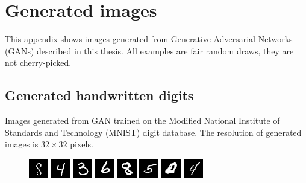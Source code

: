 \chapter{Generated images}
This appendix shows images generated from Generative Adversarial Networks (GANs) described in this thesis. All examples are fair random draws, they are not cherry-picked.

\section*{Generated handwritten digits}
Images generated from GAN trained on the Modified National Institute of Standards and Technology (MNIST) digit database. The resolution of generated images is $32 \times 32$ pixels.

\begin{figure}[!h]
    \centerline{
        \includegraphics[scale=1]{figures/mnist/appendix/mnist32x32_image0024.png}
        \includegraphics[scale=1]{figures/mnist/appendix/mnist32x32_image0025.png}
        \includegraphics[scale=1]{figures/mnist/appendix/mnist32x32_image0026.png}
        \includegraphics[scale=1]{figures/mnist/appendix/mnist32x32_image0027.png}
        \includegraphics[scale=1]{figures/mnist/appendix/mnist32x32_image0028.png}
        \includegraphics[scale=1]{figures/mnist/appendix/mnist32x32_image0029.png}
        \includegraphics[scale=1]{figures/mnist/appendix/mnist32x32_image0030.png}
        \includegraphics[scale=1]{figures/mnist/appendix/mnist32x32_image0031.png}
}
\end{figure}
